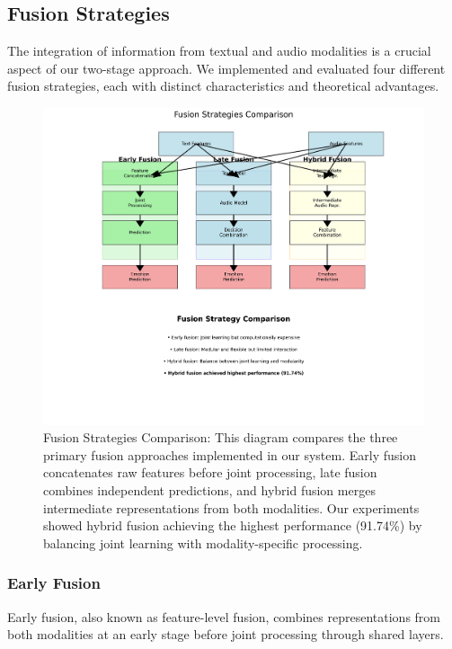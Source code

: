 \documentclass[12pt]{article}
\begin{document}
\subsection{Fusion Strategies}
\label{subsec:fusion}
The integration of information from textual and audio modalities is a crucial aspect of our two-stage approach. We implemented and evaluated four different fusion strategies, each with distinct characteristics and theoretical advantages.

\begin{figure}[h]
    \centering
    \includegraphics[width=0.9\linewidth]{Figures/fusion_strategies_comparison.png}
    \caption{Fusion Strategies Comparison: This diagram compares the three primary fusion approaches implemented in our system. Early fusion concatenates raw features before joint processing, late fusion combines independent predictions, and hybrid fusion merges intermediate representations from both modalities. Our experiments showed hybrid fusion achieving the highest performance (91.74\%) by balancing joint learning with modality-specific processing.}
    \label{fig:fusion_strategies}
\end{figure}

\subsubsection{Early Fusion}
Early fusion, also known as feature-level fusion, combines representations from both modalities at an early stage before joint processing through shared layers.
\end{document}
